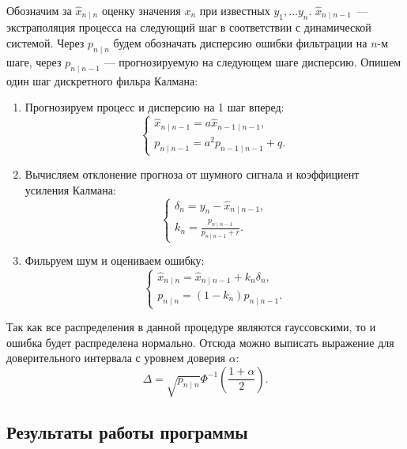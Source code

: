 \documentclass[12pt, a4paper]{article} %
\begin{document}
Обозначим за $\hat x_{n \mid n}$ оценку значения $x_n$ при известных $y_1, \ldots y_n$. $\hat x_{n \mid n-1}$~--- экстраполяция процесса на следующий шаг в соответствии с динамической системой.
Через $p_{n \mid n}$ будем обозначать дисперсию ошибки фильтрации на $n$-м шаге, через $p_{n\mid n-1}$ --- прогнозируемую на следующем шаге дисперсию.
Опишем один шаг дискретного фильра Калмана:
\begin{enumerate}
    \item Прогнозируем процесс и дисперсию на 1 шаг вперед:
        \[
            \begin{cases}
                \hat{x}_{n\mid n-1} = a \hat{x}_{n - 1\mid n-1}, \\
                p_{n \mid n - 1} = a^2 p_{n - 1 \mid n - 1} + q.
            \end{cases}
        \] 
    \item Вычисляем отклонение прогноза от шумного сигнала и коэффициент усиления Калмана:
        \[
            \begin{cases}
                \delta_n = y_n - \hat{x}_{n \mid n-1}, \\
                k_n = \frac{p_{n\mid n-1}}{p_{n \mid n-1} + r}.
            \end{cases} 
        \] 
    \item Фильруем шум и оцениваем ошибку:
        \[
            \begin{cases}
                \hat{x}_{n \mid n} = \hat{x}_{n \mid n-1} + k_n \delta_n,\\
                p_{n \mid n} = (1 - k_n) p_{n\mid n-1}.
            \end{cases} 
        \] 
\end{enumerate} 

Так как все распределения в данной процедуре являются гауссовскими, то и ошибка будет распределена нормально.
Отсюда можно выписать выражение для доверительного интервала с уровнем доверия $\alpha$:
 \[
     \Delta = \sqrt{p_{n\mid n}} \Phi^{-1}\left(\frac{1+\alpha}{2}\right). 
\] 

\subsection{Результаты работы программы}
\end{document}

